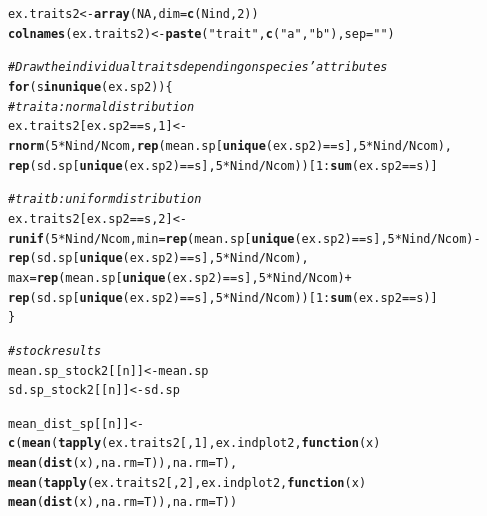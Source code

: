\documentclass[12pt]{article}\usepackage[]{graphicx}\usepackage[]{color}
\makeatletter
\newcommand{\hlnum}[1]{\textcolor[rgb]{0.686,0.059,0.569}{#1}}%
\newcommand{\hlstr}[1]{\textcolor[rgb]{0.192,0.494,0.8}{#1}}%
\newcommand{\hlcom}[1]{\textcolor[rgb]{0.678,0.584,0.686}{\textit{#1}}}%
\newcommand{\hlopt}[1]{\textcolor[rgb]{0,0,0}{#1}}%
\newcommand{\hlstd}[1]{\textcolor[rgb]{0.345,0.345,0.345}{#1}}%
\newcommand{\hlkwa}[1]{\textcolor[rgb]{0.161,0.373,0.58}{\textbf{#1}}}%
\newcommand{\hlkwb}[1]{\textcolor[rgb]{0.69,0.353,0.396}{#1}}%
\newcommand{\hlkwc}[1]{\textcolor[rgb]{0.333,0.667,0.333}{#1}}%
\newcommand{\hlkwd}[1]{\textcolor[rgb]{0.737,0.353,0.396}{\textbf{#1}}}%
\newenvironment{kframe}{%
 \def\at@end@of@kframe{}%
 \ifinner\ifhmode%
  \def\at@end@of@kframe{\end{minipage}}%
  \begin{minipage}{\columnwidth}%
 \fi\fi%
 \def\FrameCommand##1{\hskip\@totalleftmargin \hskip-\fboxsep
 \colorbox{shadecolor}{##1}\hskip-\fboxsep
     \hskip-\linewidth \hskip-\@totalleftmargin \hskip\columnwidth}%
 \MakeFramed {\advance\hsize-\width
   \@totalleftmargin\z@ \linewidth\hsize
   \@setminipage}}%
 {\par\unskip\endMakeFramed%
 \at@end@of@kframe}
\newenvironment{knitrout}{}{} %
\makeatother
\begin{document}
\begin{knitrout}
\begin{kframe}
\begin{alltt}
 \hlstd{ex.traits2} \hlkwb{<-} \hlkwd{array}\hlstd{(}\hlnum{NA}\hlstd{,} \hlkwc{dim} \hlstd{=} \hlkwd{c}\hlstd{(Nind,} \hlnum{2}\hlstd{))}
 \hlkwd{colnames}\hlstd{(ex.traits2)} \hlkwb{<-} \hlkwd{paste}\hlstd{(}\hlstr{"trait"}\hlstd{,} \hlkwd{c}\hlstd{(}\hlstr{"a"}\hlstd{,} \hlstr{"b"}\hlstd{),} \hlkwc{sep} \hlstd{=} \hlstr{" "}\hlstd{)}

 \hlcom{# Draw the individual traits depending on species' attributes}
  \hlkwa{for}\hlstd{(s} \hlkwa{in} \hlkwd{unique}\hlstd{(ex.sp2))\{}
   \hlcom{#trait a : normal distribution}
   \hlstd{ex.traits2[ex.sp2} \hlopt{==} \hlstd{s,} \hlnum{1}\hlstd{]} \hlkwb{<-}
   \hlkwd{rnorm}\hlstd{(}\hlnum{5}\hlopt{*}\hlstd{Nind}\hlopt{/}\hlstd{Ncom,} \hlkwd{rep}\hlstd{(mean.sp[}\hlkwd{unique}\hlstd{(ex.sp2)} \hlopt{==} \hlstd{s],} \hlnum{5}\hlopt{*}\hlstd{Nind}\hlopt{/}\hlstd{Ncom),}
         \hlkwd{rep}\hlstd{(sd.sp[}\hlkwd{unique}\hlstd{(ex.sp2)} \hlopt{==} \hlstd{s],} \hlnum{5}\hlopt{*}\hlstd{Nind}\hlopt{/}\hlstd{Ncom))[}\hlnum{1}\hlopt{:}\hlkwd{sum}\hlstd{(ex.sp2} \hlopt{==} \hlstd{s)]}

   \hlcom{#trait b : uniform distribution}
   \hlstd{ex.traits2[ex.sp2} \hlopt{==} \hlstd{s,} \hlnum{2}\hlstd{]} \hlkwb{<-}
   \hlkwd{runif}\hlstd{(}\hlnum{5}\hlopt{*}\hlstd{Nind}\hlopt{/}\hlstd{Ncom,} \hlkwc{min} \hlstd{=} \hlkwd{rep}\hlstd{(mean.sp[}\hlkwd{unique}\hlstd{(ex.sp2)} \hlopt{==} \hlstd{s],} \hlnum{5}\hlopt{*}\hlstd{Nind}\hlopt{/}\hlstd{Ncom)} \hlopt{-}
         \hlkwd{rep}\hlstd{(sd.sp[}\hlkwd{unique}\hlstd{(ex.sp2)} \hlopt{==} \hlstd{s],} \hlnum{5}\hlopt{*}\hlstd{Nind}\hlopt{/}\hlstd{Ncom),}
         \hlkwc{max} \hlstd{=} \hlkwd{rep}\hlstd{(mean.sp[}\hlkwd{unique}\hlstd{(ex.sp2)} \hlopt{==} \hlstd{s],} \hlnum{5}\hlopt{*}\hlstd{Nind}\hlopt{/}\hlstd{Ncom)} \hlopt{+}
         \hlkwd{rep}\hlstd{(sd.sp[}\hlkwd{unique}\hlstd{(ex.sp2)} \hlopt{==} \hlstd{s],} \hlnum{5}\hlopt{*}\hlstd{Nind}\hlopt{/}\hlstd{Ncom))[}\hlnum{1}\hlopt{:}\hlkwd{sum}\hlstd{(ex.sp2} \hlopt{==} \hlstd{s)]}
  \hlstd{\}}

 \hlcom{#stock results}
 \hlstd{mean.sp_stock2[[n]]} \hlkwb{<-} \hlstd{mean.sp}
 \hlstd{sd.sp_stock2[[n]]} \hlkwb{<-} \hlstd{sd.sp}

 \hlstd{mean_dist_sp[[n]]} \hlkwb{<-} \hlkwd{c}\hlstd{(}\hlkwd{mean}\hlstd{(}\hlkwd{tapply}\hlstd{(ex.traits2[,} \hlnum{1}\hlstd{], ex.indplot2,} \hlkwa{function}\hlstd{(}\hlkwc{x}\hlstd{)}
                                    \hlkwd{mean}\hlstd{(}\hlkwd{dist}\hlstd{(x),} \hlkwc{na.rm}\hlstd{=T)),} \hlkwc{na.rm}\hlstd{=T),}
                        \hlkwd{mean}\hlstd{(}\hlkwd{tapply}\hlstd{(ex.traits2[,} \hlnum{2}\hlstd{], ex.indplot2,} \hlkwa{function}\hlstd{(}\hlkwc{x}\hlstd{)}
                                    \hlkwd{mean}\hlstd{(}\hlkwd{dist}\hlstd{(x),} \hlkwc{na.rm}\hlstd{=T)),} \hlkwc{na.rm}\hlstd{=T))}


\end{alltt}
\end{kframe}
\end{knitrout}
\end{document}
